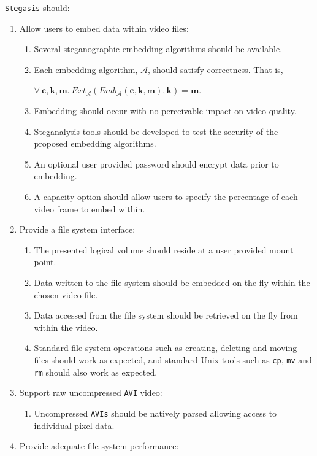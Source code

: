\documentclass[paper=a4, fontsize=11pt,twoside]{scrartcl}
\numberwithin{table}{section}
\numberwithin{figure}{section}
\numberwithin{algorithm}{section}
\begin{document}
\texttt{Stegasis} should:

\begin{enumerate}
\item Allow users to embed data within video files:
	\begin{enumerate}
		\item Several steganographic embedding algorithms should be available.
		\item Each embedding algorithm, $\mathcal{A}$, should satisfy correctness. That is,
		\begin{center}
			$\forall ~\textbf{c}, \textbf{k}, \textbf{m}. ~Ext_{\mathcal{A}}(Emb_{\mathcal{A}}(\textbf{c}, \textbf{k}, \textbf{m}), \textbf{k}) = \textbf{m}$.
		\end{center}
		\item Embedding should occur with no perceivable impact on video quality.
		\item Steganalysis tools should be developed to test the security of the proposed embedding algorithms.
		\item An optional user provided password should encrypt data prior to embedding.
		\item A capacity option should allow users to specify the percentage of each video frame to embed within.
	\end{enumerate}
\item Provide a file system interface:
	\begin{enumerate}
		\item The presented logical volume should reside at a user provided mount point.		
		\item Data written to the file system should be embedded on the fly within the chosen video file.
		\item Data accessed from the file system should be retrieved on the fly from within the video.
		\item Standard file system operations such as creating, deleting and moving files should work as expected, and standard Unix tools such as \texttt{cp}, \texttt{mv} and \texttt{rm} should also work as expected.
	\end{enumerate}	
\item Support raw uncompressed \texttt{AVI} video:
	\begin{enumerate}
		\item Uncompressed \texttt{AVIs} should be natively parsed allowing access to individual pixel data.
	\end{enumerate}	
\item Provide adequate file system performance:

\end{enumerate}
\end{document}
